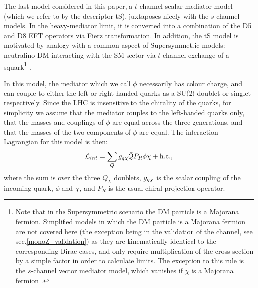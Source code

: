 
The last model considered in this paper, a $t$-channel scalar mediator model (which we refer to by the descriptor tS), juxtaposes nicely with the $s$-channel models. In the heavy-mediator limit, it is converted into a combination of the D5 and D8 EFT operators via Fierz transformation. In addition, the tS model is motivated by analogy with a common aspect of Supersymmetric models: neutralino DM interacting with the SM sector via $t$-channel exchange of a squark\footnote{Note that in the Supersymmetric scenario the DM particle is a Majorana fermion. Simplified models in which the DM particle is a Majorana fermion are not covered here (the exception being in the validation of the \monoZ channel, see sec.\ref{monoZ_validation}) as they are kinematically identical to the corresponding Dirac cases, and only require multiplication of the cross-section by a simple factor in order to calculate limits. The exception to this rule is the $s$-channel vector mediator model, which vanishes if $\chi$ is a Majorana fermion \cite{METSig}.} \cite{SUSYDM}.

In this model, the mediator which we call $\phi$ necessarily has colour charge, and can couple to either the left or right-handed quarks as a SU(2) doublet or singlet respectively. Since the LHC is insensitive to the chirality of the quarks, for simplicity we assume that the mediator couples to the left-handed quarks only, that the masses and couplings of $\phi$ are equal across the three generations, and that the masses of the two components of $\phi$ are equal. The interaction Lagrangian for this model is then:
\begin{equation}
\label{L_int_tS}
\mathcal{L}_{int} = \sum_{Q} g_{q \chi} \bar{Q} P_R \phi \chi + {\rm h.c.},
\end{equation}
where the sum is over the three $Q_L$ doublets, $g_{q \chi}$ is the scalar coupling of the incoming quark, $\phi$ and $\chi$, and $P_R$ is the usual chiral projection operator.

